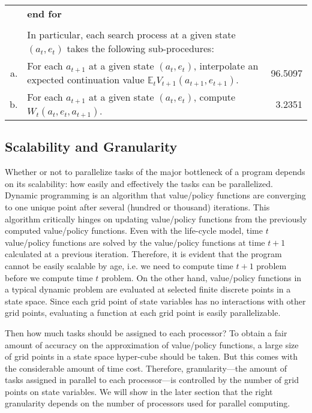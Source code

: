\documentclass[12pt]{article}
\begin{document}
\begin{table}[h!]
\begin{tabular}{r p{12cm} r}
&  \textbf{end for}\\
&\\
& In particular, each search process at a given state $(a_{t},e_{t})$ takes the following sub-procedures:\\
		a.& For each $a_{t+1}$ at a given state $(a_t,e_t)$, interpolate an expected continuation value $\mathbb{E}_t V_{t+1}(a_{t+1},e_{t+1})$. & 96.5097\\
		b.& For each $a_{t+1}$ at a given state $(a_t,e_t)$, compute $W_t(a_{t},e_t,a_{t+1})$. &3.2351\\
\hline
\end{tabular}
\end{table}

\subsection{Scalability and Granularity}
Whether or not to parallelize tasks of the major bottleneck of a program depends on its scalability: how easily and effectively the tasks can be parallelized. Dynamic programming is an algorithm that value/policy functions are converging to one unique point after several (hundred or thousand) iterations. This algorithm critically hinges on updating value/policy functions from the previously computed value/policy functions. Even with the life-cycle model, time $t$ value/policy functions are solved by the value/policy functions at time $t+1$ calculated at a previous iteration. Therefore, it is evident that the program cannot be easily scalable by age, i.e. we need to compute time $t+1$ problem before we compute time $t$ problem. On the other hand, value/policy functions in a typical dynamic problem are evaluated at selected finite discrete points in a state space. Since each grid point of state variables has no interactions with other grid points, evaluating a function at each grid point is easily parallelizable. 


Then how much tasks should be assigned to each processor? To obtain a fair amount of accuracy on the approximation of value/policy functions, a large size of grid points in a state space hyper-cube should be taken. But this comes with the considerable amount of time cost. Therefore, granularity---the amount of tasks assigned in parallel to each processor---is controlled by the number of grid points on state variables. We will show in the later section that the right granularity depends on the number of processors used for parallel computing.
\end{document}
